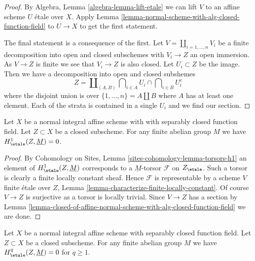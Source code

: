 \begin{proof}
By Algebra, Lemma \ref{algebra-lemma-lift-etale}
we can lift $V$ to an affine scheme $U$ \'etale over $X$.
Apply Lemma \ref{lemma-normal-scheme-with-alg-closed-function-field}
to $U \to X$ to get the first statement.

\medskip\noindent
The final statement is a consequence of the first.
Let $V = \coprod_{i = 1, \ldots, n} V_i$ be a finite
decomposition into open and
closed subschemes with $V_i \to Z$ an open immersion.
As $V \to Z$ is finite we see that $V_i \to Z$ is also closed.
Let $U_i \subset Z$ be the image. Then we have a decomposition
into open and closed subshemes
$$
Z =
\coprod\nolimits_{(A, B)}
\bigcap\nolimits_{i \in A} U_i \cap
\bigcap\nolimits_{i \in B} U_i^c
$$
where the disjoint union is over $\{1, \ldots, n\} = A \amalg B$
where $A$ has at least one element.
Each of the strata is contained in a single $U_i$ and
we find our section.
\end{proof}

\begin{lemma}
\label{lemma-gabber-for-h1-absolutely-algebraically-closed}
Let $X$ be a normal integral affine scheme with with separably closed
function field. Let $Z \subset X$ be a closed subscheme.
For any finite abelian group $M$ we have $H^1_\etale(Z, \underline{M}) = 0$.
\end{lemma}

\begin{proof}
By Cohomology on Sites, Lemma \ref{sites-cohomology-lemma-torsors-h1}
an element of $H^1_\etale(Z, \underline{M})$ corresponds to a
$\underline{M}$-torsor $\mathcal{F}$ on $Z_\etale$.
Such a torsor is clearly a finite locally constant sheaf.
Hence $\mathcal{F}$ is representable by a scheme $V$ finite
\'etale over $Z$, Lemma \ref{lemma-characterize-finite-locally-constant}.
Of course $V \to Z$ is surjective as a torsor is locally trivial.
Since $V \to Z$ has a section by
Lemma \ref{lemma-closed-of-affine-normal-scheme-with-alg-closed-function-field}
we are done.
\end{proof}

\begin{lemma}
\label{lemma-gabber-for-absolutely-algebraically-closed}
Let $X$ be a normal integral affine scheme with separably closed
function field. Let $Z \subset X$ be a closed subscheme.
For any finite abelian group $M$ we have
$H^q_\etale(Z, \underline{M}) = 0$ for $q \geq 1$.
\end{lemma}

